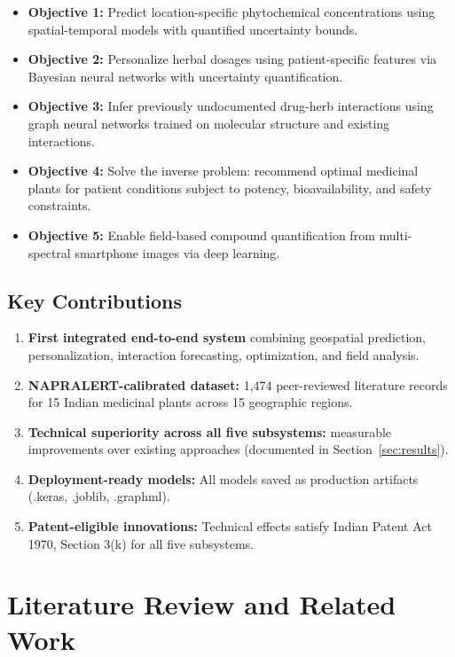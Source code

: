 \documentclass[11pt,a4paper]{article}
\begin{document}
\begin{itemize}
    \item \textbf{Objective 1:} Predict location-specific phytochemical concentrations using spatial-temporal models with quantified uncertainty bounds.
    \item \textbf{Objective 2:} Personalize herbal dosages using patient-specific features via Bayesian neural networks with uncertainty quantification.
    \item \textbf{Objective 3:} Infer previously undocumented drug-herb interactions using graph neural networks trained on molecular structure and existing interactions.
    \item \textbf{Objective 4:} Solve the inverse problem: recommend optimal medicinal plants for patient conditions subject to potency, bioavailability, and safety constraints.
    \item \textbf{Objective 5:} Enable field-based compound quantification from multi-spectral smartphone images via deep learning.
\end{itemize}

\subsection{Key Contributions}

\begin{enumerate}
    \item \textbf{First integrated end-to-end system} combining geospatial prediction, personalization, interaction forecasting, optimization, and field analysis.
    \item \textbf{NAPRALERT-calibrated dataset:} 1,474 peer-reviewed literature records for 15 Indian medicinal plants across 15 geographic regions.
    \item \textbf{Technical superiority across all five subsystems:} measurable improvements over existing approaches (documented in Section~\ref{sec:results}).
    \item \textbf{Deployment-ready models:} All models saved as production artifacts (.keras, .joblib, .graphml).
    \item \textbf{Patent-eligible innovations:} Technical effects satisfy Indian Patent Act 1970, Section 3(k) for all five subsystems.
\end{enumerate}

\section{Literature Review and Related Work}
\end{document}
